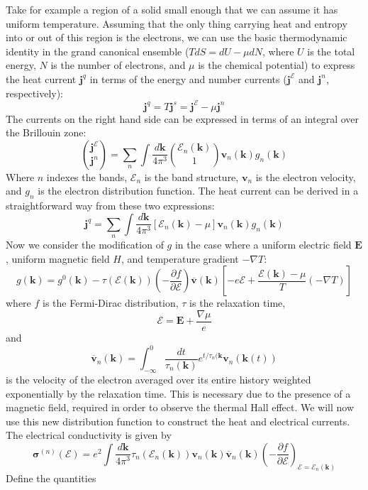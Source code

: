 \documentclass{thesis-umich}
\begin{document}
Take for example a region of a solid small enough that we can assume it has
uniform temperature. Assuming that the only thing carrying heat and entropy into
or out of this region is the electrons, we can use the basic thermodynamic
identity in the grand canonical ensemble ($T dS = dU - \mu dN$, where $U$ is the
total energy, $N$ is the number of electrons, and $\mu$ is the chemical
potential) to express the heat current $\mathbf{j}^q$ in terms of the energy and
number currents ($\mathbf{j}^\mathcal{E}$ and $\mathbf{j}^n$, respectively):
\[ \mathbf{j}^q = T \mathbf{j}^s = \mathbf{j}^\mathcal{E} - \mu \mathbf{j}^n\]
The currents on the right hand side can be expressed in terms of an integral
over the Brillouin zone:
\[ \binom{\mathbf{j}^\mathcal{E}}{\mathbf{j}^n} = \sum_n \int
	\frac{d\mathbf{k}}{4\pi^3}\binom{\mathcal{E}_n(\mathbf{k})}{1}
	\mathbf{v}_n(\mathbf{k})g_n(\mathbf{k}) \]
Where $n$ indexes the bands, $\mathcal{E}_n$ is the band structure,
$\mathbf{v}_n$ is the electron velocity, and $g_n$ is the electron distribution
function. The heat current can be derived in a straightforward way from these
two expressions:
\[ \mathbf{j}^q = \sum_n \int
	\frac{d\mathbf{k}}{4\pi^3}[\mathcal{E}_n(\mathbf{k})-\mu]
	\mathbf{v}_n(\mathbf{k})g_n(\mathbf{k}) \]
Now we consider the modification of $g$ in the case where a uniform electric
field $\mathbf{E}$, uniform magnetic field $H$, and temperature gradient $-\nabla
T$:
\[ g(\mathbf{k}) = g^0(\mathbf{k}) -
	\tau(\mathcal{E}(\mathbf{k}))\left(-\frac{\partial f}{\partial
		\mathcal{E}}\right)\overline{\mathbf{v}}(\mathbf{k})\left[-e\mathbf{\mathcal{E}}
		+ \frac{\mathcal{E}(\mathbf{k}) - \mu}{T}(-\nabla T)\right] \]
where $f$ is the Fermi-Dirac distribution, $\tau$ is the relaxation time,
\[\mathbf{\mathcal{E}} = \mathbf{E} + \frac{\nabla\mu}{e}\]
and 
\[\overline{\mathbf{v}}_n(\mathbf{k}) = \int_{-\infty}^0
\frac{dt}{\tau_n(\mathbf{k})}e^{t/\tau_n(\mathbf{k}}\mathbf{v}_n(\mathbf{k}(t))\]
is the velocity of the electron averaged over its entire history weighted
exponentially by the relaxation time. This is necessary due to the presence of a
magnetic field, required in order to observe the thermal Hall effect. We will
now use this new distribution function to construct the heat and electrical
currents. The electrical conductivity is given by
\[ \mathbf{\sigma}^{(n)}(\mathcal{E}) = e^2 \int \frac{d\mathbf{k}}{4\pi^3}
\tau_n(\mathcal{E}_n(\mathbf{k}))
\mathbf{v}_n(\mathbf{k})\overline{\mathbf{v}}_n(\mathbf{k})\left(-\frac{\partial
f}{\partial \mathcal{E}}\right)_{\mathcal{E}=\mathcal{E}_n(\mathbf{k})}\]
Define the quantities
\end{document}
